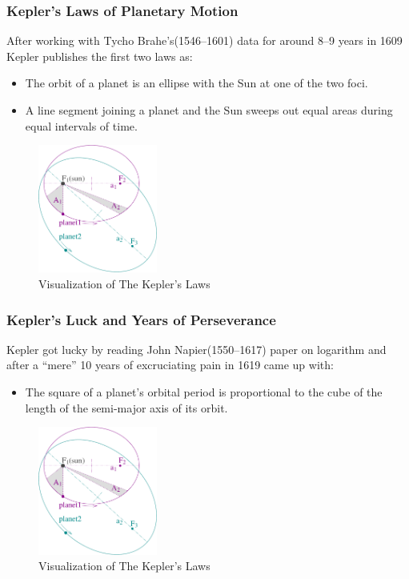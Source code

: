 \begin{frame}
  \frametitle{Kepler's Laws of Planetary Motion}
  \pause
  After working with Tycho Brahe's(1546--1601) data for around 8--9 years in 1609 Kepler publishes the first two laws as:
  \begin{itemize}
    \pause
    \item The orbit of a planet is an ellipse with the Sun at one of the two foci.
    \pause
    \item A line segment joining a planet and the Sun sweeps out equal areas during equal intervals of time.
  \end{itemize}
  \pause
    \begin{figure}
      \centering
      \includegraphics[width=0.35\textwidth]{./data/image/kepler_laws_diagram.pdf}
    \caption{Visualization of The Kepler's Laws}
    \end{figure}
  \end{frame}
  \begin{frame}
      \frametitle{Kepler's Luck and Years of Perseverance}
      \pause
      Kepler got lucky by reading John Napier(1550--1617) paper on logarithm and after a ``mere'' 10 years of 
      excruciating pain in 1619 came up with:
      \begin{itemize}
          \pause
        \item The square of a planet's orbital period is proportional to the cube of the length of the semi-major axis of its orbit.
      \end{itemize}
      \pause
        \begin{figure}
          \centering
          \includegraphics[width=0.35\textwidth]{./data/image/kepler_laws_diagram.pdf}
        \caption{Visualization of The Kepler's Laws}
        \label{image:kepler_luck_napier}
        \end{figure}
      \end{frame}
  
